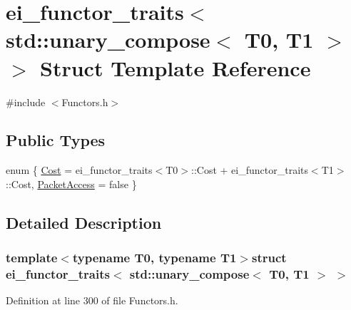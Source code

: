 \hypertarget{structei__functor__traits_3_01std_1_1unary__compose_3_01_t0_00_01_t1_01_4_01_4}{\section{ei\-\_\-functor\-\_\-traits$<$ std\-:\-:unary\-\_\-compose$<$ T0, T1 $>$ $>$ Struct Template Reference}
\label{structei__functor__traits_3_01std_1_1unary__compose_3_01_t0_00_01_t1_01_4_01_4}
}


{\ttfamily \#include $<$Functors.\-h$>$}

\subsection*{Public Types}
\begin{DoxyCompactItemize}
\item 
enum \{ \hyperlink{structei__functor__traits_3_01std_1_1unary__compose_3_01_t0_00_01_t1_01_4_01_4_abacfe00f9a10f611f17e645ad73f0438aa4d3c0466cfb0d10746830b683a49815}{Cost} = ei\-\_\-functor\-\_\-traits$<$T0$>$\-:\-:Cost + ei\-\_\-functor\-\_\-traits$<$T1$>$\-:\-:Cost, 
\hyperlink{structei__functor__traits_3_01std_1_1unary__compose_3_01_t0_00_01_t1_01_4_01_4_abacfe00f9a10f611f17e645ad73f0438af1b0d287e5e1d68da77ff4f8ad94cff2}{Packet\-Access} = false
 \}
\end{DoxyCompactItemize}


\subsection{Detailed Description}
\subsubsection*{template$<$typename T0, typename T1$>$struct ei\-\_\-functor\-\_\-traits$<$ std\-::unary\-\_\-compose$<$ T0, T1 $>$ $>$}



Definition at line 300 of file Functors.\-h.



